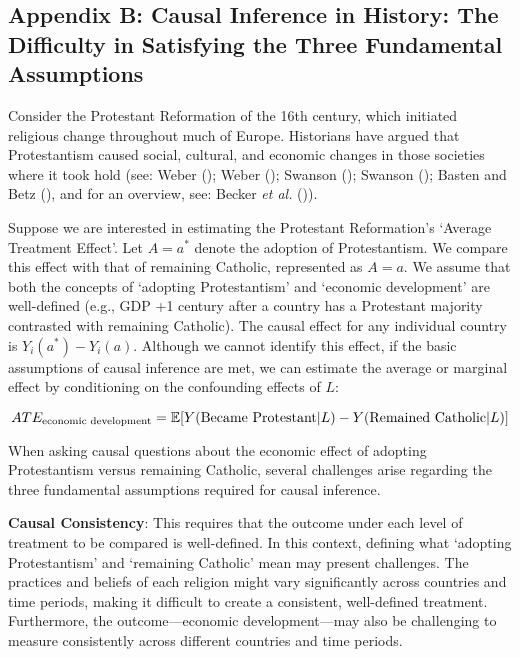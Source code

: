 \documentclass[
  single column]{article}
\begin{document}
\newpage{}

\subsection{Appendix B: Causal Inference in History: The Difficulty in
Satisfying the Three Fundamental Assumptions}\label{id-app-b}

Consider the Protestant Reformation of the 16th century, which initiated
religious change throughout much of Europe. Historians have argued that
Protestantism caused social, cultural, and economic changes in those
societies where it took hold (see: Weber
(); Weber
(); Swanson
(); Swanson
(); Basten and Betz
(), and for an overview, see: Becker
\emph{et al.} ()).

Suppose we are interested in estimating the Protestant Reformation's
`Average Treatment Effect'. Let \(A = a^*\) denote the adoption of
Protestantism. We compare this effect with that of remaining Catholic,
represented as \(A = a\). We assume that both the concepts of `adopting
Protestantism' and `economic development' are well-defined (e.g., GDP +1
century after a country has a Protestant majority contrasted with
remaining Catholic). The causal effect for any individual country is
\(Y_i(a^*) - Y_i(a)\). Although we cannot identify this effect, if the
basic assumptions of causal inference are met, we can estimate the
average or marginal effect by conditioning on the confounding effects of
\(L\):

\[
ATE_{\textnormal{economic~development}} = \mathbb{E}[Y(\textnormal{Became~Protestant}|L) - Y(\textnormal{Remained~Catholic}|L)]
\]

When asking causal questions about the economic effect of adopting
Protestantism versus remaining Catholic, several challenges arise
regarding the three fundamental assumptions required for causal
inference.

\textbf{Causal Consistency}: This requires that the outcome under each
level of treatment to be compared is well-defined. In this context,
defining what `adopting Protestantism' and `remaining Catholic' mean may
present challenges. The practices and beliefs of each religion might
vary significantly across countries and time periods, making it
difficult to create a consistent, well-defined treatment. Furthermore,
the outcome---economic development---may also be challenging to measure
consistently across different countries and time periods.
\end{document}
